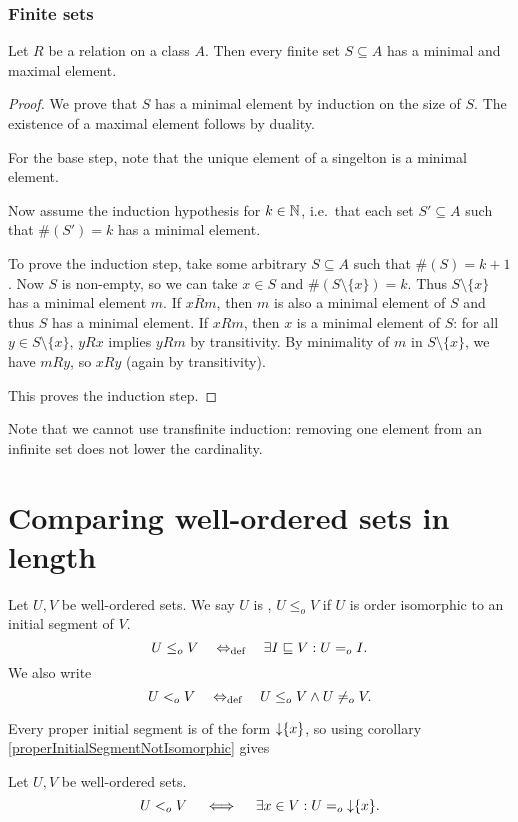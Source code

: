 \subsubsection{Finite sets}
\begin{proposition} \label{minimalMaximalFiniteSet}
Let $R$ be a relation on a class $A$. Then every finite set $S\subseteq A$ has a minimal and maximal element.
\end{proposition}
\begin{proof}
We prove that $S$ has a minimal element by induction on the size of $S$. The existence of a maximal element follows by duality.

For the base step, note that the unique element of a singelton is a minimal element.

Now assume the induction hypothesis for $k\in \mathbb{N}$, i.e.\ that each set $S'\subseteq A$ such that $\#(S') = k$ has a minimal element.

To prove the induction step, take some arbitrary $S\subseteq A$ such that $\#(S) = k+1$. Now $S$ is non-empty, so we can take $x\in S$ and $\#(S\setminus \{x\}) = k$. Thus $S\setminus \{x\}$ has a minimal element $m$. If $x\overline{R}m$, then $m$ is also a minimal element of $S$ and thus $S$ has a minimal element.
If $xRm$, then $x$ is a minimal element of $S$: for all $y\in S\setminus\{x\}$,  $yRx$ implies $yRm$ by transitivity. By minimality of $m$ in $S\setminus\{x\}$, we have $mRy$, so $xRy$ (again by transitivity).

This proves the induction step.
\end{proof}
Note that we cannot use transfinite induction: removing one element from an infinite set does not lower the cardinality.

\section{Comparing well-ordered sets in length}
\begin{definition}
Let $U,V$ be well-ordered sets. We say $U$ is , $U\leq_o V$ if $U$ is order isomorphic to an initial segment of $V$.
\[ U\leq_o V \quad\Leftrightarrow_{\text{def}}\quad \exists I\sqsubseteq V: U =_o I. \]
We also write
\[ U <_o V \quad\Leftrightarrow_{\text{def}}\quad U\leq_o V \land U\neq_o V. \]
\end{definition}
Every proper initial segment is of the form $\operatorname{\downarrow}\{x\}$, so using corollary \ref{properInitialSegmentNotIsomorphic} gives
\begin{lemma}
Let $U,V$ be well-ordered sets.
\[ U <_o V \quad \iff \quad \exists x\in V: U =_o \operatorname{\downarrow}\{x\}. \]
\end{lemma}

